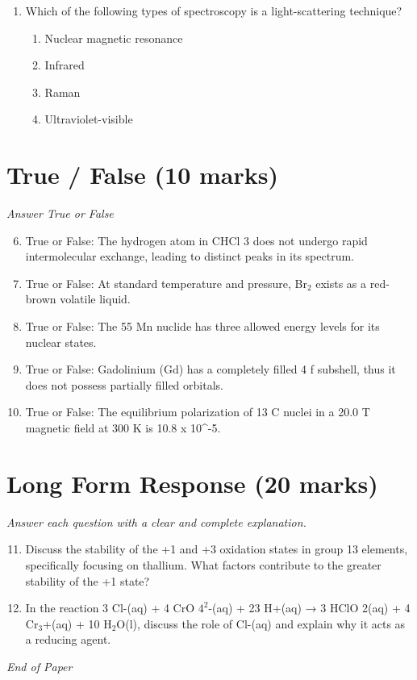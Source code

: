 \documentclass[12pt]{article}
\begin{document}
\begin{enumerate}[label=\arabic*.]
\begin{enumerate}[label=(\alph*)]
    \item Neutrons
    \item Alpha particles
    \item Beta particles
    \item X-rays
\end{enumerate}
\item Which of the following types of spectroscopy is a light-scattering technique?
\begin{enumerate}[label=(\alph*)]
    \item Nuclear magnetic resonance
    \item Infrared
    \item Raman
    \item Ultraviolet-visible
\end{enumerate}
\end{enumerate}

\section*{True / False (10 marks)}
\textit{Answer True or False}
\begin{enumerate}[label=\arabic*.]
\setcounter{enumi}{5}
\item True or False: The hydrogen atom in CHCl 3 does not undergo rapid intermolecular exchange, leading to distinct peaks in its spectrum.
\item True or False: At standard temperature and pressure, Br$_{2}$ exists as a red-brown volatile liquid.
\item True or False: The 55 Mn nuclide has three allowed energy levels for its nuclear states.
\item True or False: Gadolinium (Gd) has a completely filled 4 f subshell, thus it does not possess partially filled orbitals.
\item True or False: The equilibrium polarization of 13 C nuclei in a 20.0 T magnetic field at 300 K is 10.8 x 10^-5.
\end{enumerate}

\section*{Long Form Response (20 marks)}
\textit{Answer each question with a clear and complete explanation.}
\begin{enumerate}[label=\arabic*.]
\setcounter{enumi}{10}
\item Discuss the stability of the +1 and +3 oxidation states in group 13 elements, specifically focusing on thallium. What factors contribute to the greater stability of the +1 state?
\item In the reaction 3 Cl-(aq) + 4 CrO $4^2$-(aq) + 23 H+(aq) → 3 HClO 2(aq) + 4 Cr$_{3}$+(aq) + 10 H$_{2}$O(l), discuss the role of Cl-(aq) and explain why it acts as a reducing agent.
\end{enumerate}

\vfill
\noindent\textit{End of Paper}
\end{document}
